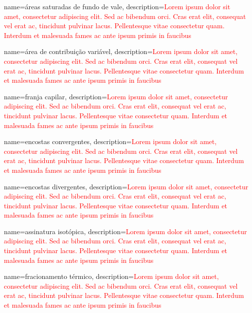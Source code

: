 {
    name=áreas saturadas de fundo de vale,
    description={\textcolor{red}{Lorem ipsum dolor sit amet, consectetur adipiscing elit. Sed ac bibendum orci. Cras erat elit, consequat vel erat ac, tincidunt pulvinar lacus. Pellentesque vitae consectetur quam. Interdum et malesuada fames ac ante ipsum primis in faucibus}}
}

{
    name=área de contribuição variável,
    description={\textcolor{red}{Lorem ipsum dolor sit amet, consectetur adipiscing elit. Sed ac bibendum orci. Cras erat elit, consequat vel erat ac, tincidunt pulvinar lacus. Pellentesque vitae consectetur quam. Interdum et malesuada fames ac ante ipsum primis in faucibus}}
}

{
    name=franja capilar,
    description={\textcolor{red}{Lorem ipsum dolor sit amet, consectetur adipiscing elit. Sed ac bibendum orci. Cras erat elit, consequat vel erat ac, tincidunt pulvinar lacus. Pellentesque vitae consectetur quam. Interdum et malesuada fames ac ante ipsum primis in faucibus}}
}

{
    name=encostas convergentes,
    description={\textcolor{red}{Lorem ipsum dolor sit amet, consectetur adipiscing elit. Sed ac bibendum orci. Cras erat elit, consequat vel erat ac, tincidunt pulvinar lacus. Pellentesque vitae consectetur quam. Interdum et malesuada fames ac ante ipsum primis in faucibus}}
}

{
    name=encostas divergentes,
    description={\textcolor{red}{Lorem ipsum dolor sit amet, consectetur adipiscing elit. Sed ac bibendum orci. Cras erat elit, consequat vel erat ac, tincidunt pulvinar lacus. Pellentesque vitae consectetur quam. Interdum et malesuada fames ac ante ipsum primis in faucibus}}
}

{
    name=assinatura isotópica,
    description={\textcolor{red}{Lorem ipsum dolor sit amet, consectetur adipiscing elit. Sed ac bibendum orci. Cras erat elit, consequat vel erat ac, tincidunt pulvinar lacus. Pellentesque vitae consectetur quam. Interdum et malesuada fames ac ante ipsum primis in faucibus}}
}

{
    name=fracionamento térmico,
    description={\textcolor{red}{Lorem ipsum dolor sit amet, consectetur adipiscing elit. Sed ac bibendum orci. Cras erat elit, consequat vel erat ac, tincidunt pulvinar lacus. Pellentesque vitae consectetur quam. Interdum et malesuada fames ac ante ipsum primis in faucibus}}
}

